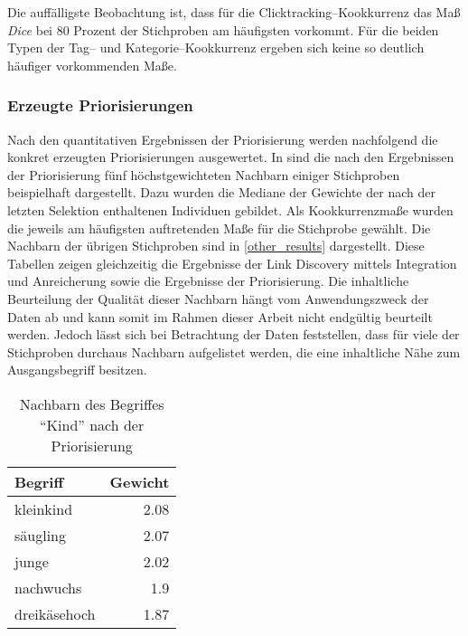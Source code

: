 Die auffälligste Beobachtung ist, dass für die Clicktracking--Kookkurrenz das Maß \emph{Dice} bei \num{80} Prozent der Stichproben am häufigsten vorkommt. Für die beiden Typen der Tag-- und Kategorie--Kookkurrenz ergeben sich keine so deutlich häufiger vorkommenden Maße.

\subsubsection{Erzeugte Priorisierungen}

Nach den quantitativen Ergebnissen der Priorisierung werden nachfolgend die konkret erzeugten Priorisierungen ausgewertet. In  sind die nach den Ergebnissen der Priorisierung fünf höchstgewichteten Nachbarn einiger Stichproben beispielhaft dargestellt. Dazu wurden die Mediane der Gewichte der nach der letzten Selektion enthaltenen Individuen gebildet. Als Kookkurrenzmaße wurden die jeweils am häufigsten auftretenden Maße für die Stichprobe gewählt. Die Nachbarn der übrigen Stichproben sind in \cref{other_results} dargestellt. Diese Tabellen zeigen gleichzeitig die Ergebnisse der Link Discovery mittels Integration und Anreicherung sowie die Ergebnisse der Priorisierung. Die inhaltliche Beurteilung der Qualität dieser Nachbarn hängt vom Anwendungszweck der Daten ab und kann somit im Rahmen dieser Arbeit nicht endgültig beurteilt werden. Jedoch lässt sich bei Betrachtung der Daten feststellen, dass für viele der Stichproben durchaus Nachbarn aufgelistet werden, die eine inhaltliche Nähe zum Ausgangsbegriff besitzen.

\begin{table}[p]
\centering
\begin{tabular*}{0.9\textwidth}{@{\extracolsep{\fill} } lr}
    \toprule
    Begriff & Gewicht \\
    \midrule
    kleinkind & \num{2.08} \\
    säugling & \num{2.07} \\
    junge & \num{2.02} \\
    nachwuchs & \num{1.9} \\
    dreikäsehoch & \num{1.87} \\
    \bottomrule
\end{tabular*}
\caption{Nachbarn des Begriffes ``Kind'' nach der Priorisierung}
\label{tab:prio_res_kind}
\end{table}

